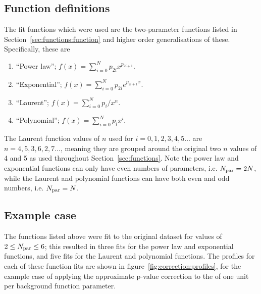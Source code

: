 \subsection{Function definitions}
\label{sec:correction:functions}
The fit functions which were used are the two-parameter functions listed in 
Section~\ref{sec:functions:function} and higher order generalisations of
these. Specifically, these are
\begin{enumerate}
\item
``Power law''; $f(x) = \sum_{i=0}^N p_{2i} x^{p_{2i+1}}$.
\item
``Exponential''; $f(x) = \sum_{i=0}^N p_{2i} e^{p_{2i+1}x}$.
\item
``Laurent''; $f(x) = \sum_{i=0}^N p_i/x^n$.
\item
``Polynomial''; $f(x) = \sum_{i=0}^N p_i x^i$.
\end{enumerate}
The Laurent function values of $n$ used for $i=0,1,2,3,4,5\dots$ are
$n=4,5,3,6,2,7\dots$, meaning they are grouped around the original
two $n$ values of 4 and 5 as used throughout Section~\ref{sec:functions}.
Note the power law and exponential functions can only have even numbers of
parameters, i.e. $N_{\rm par}=2N$, while the Laurent and polynomial functions
can have both even and odd numbers, i.e. $N_{\rm par}=N$.


\subsection{Example case}
\label{sec:correction:example}

The functions listed above were fit to the original dataset for values of 
$2 \le N_{\rm par} \le 6$; this resulted in three fits for the power law and
exponential functions, and five fits for the Laurent and polynomial functions.
The profiles for each of these function fits are shown in
figure~\ref{fig:correction:profiles}, for the example case of 
applying the approximate p-value correction to the \nll of one unit per 
background function parameter.

